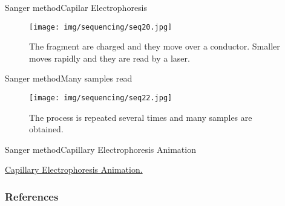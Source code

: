\documentclass[10pt]{beamer}
\newcommand{\1}{
	\setbeamertemplate{background}{
		\texttt{[image: img/1]}
		\tikz[overlay] \fill[fill opacity=0.75,fill=white] (0,0) rectangle (-\paperwidth,\paperheight);
	}
}
\begin{document}
\begin{frame}{Sanger method}{Capilar Electrophoresis}
	\begin{figure}[]
		\centering
		\texttt{[image: img/sequencing/seq20.jpg]}
		\label{img:mot2}
		\caption{The fragment are charged and they move over a conductor. Smaller moves rapidly and they are read by a laser.}
	\end{figure}
\end{frame}

\begin{frame}{Sanger method}{Many samples read}
	\begin{figure}[]
		\centering
		\texttt{[image: img/sequencing/seq22.jpg]}
		\label{img:mot2}
		\caption{The process is repeated several times and many samples are obtained.}
	\end{figure}
\end{frame}












\begin{frame}{Sanger method}{Capillary Electrophoresis Animation}
	\begin{block}{}
		\href{https://www.youtube.com/watch?v=wdS3j0TgbjM&list=PLgM5s3vRHCgejiz7lKLR318mXs0ox4NFC&index=6&t=0s}{Capillary Electrophoresis Animation.}
		
	\end{block}
\end{frame}


\begin{frame}[allowframebreaks]
        \frametitle{References}
        
        
\end{frame}
\end{document}
